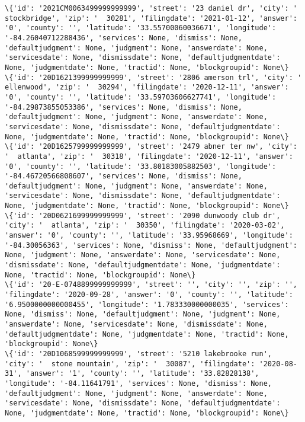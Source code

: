 \documentclass[11pt]{article}
\begin{document}
\begin{Verbatim}[commandchars=\\\{\}]
\{'id': '2021CM0063499999999999', 'street': '23 daniel dr', 'city': '  stockbridge', 'zip': '  30281', 'filingdate': '2021-01-12', 'answer': '0', 'county': '', 'latitude': '33.55700060036671', 'longitude': '-84.26040712288436', 'services': None, 'dismiss': None, 'defaultjudgment': None, 'judgment': None, 'answerdate': None, 'servicesdate': None, 'dismissdate': None, 'defaultjudgmentdate': None, 'judgmentdate': None, 'tractid': None, 'blockgroupid': None\}
\{'id': '20D1621399999999999', 'street': '2806 amerson trl', 'city': '  ellenwood', 'zip': '  30294', 'filingdate': '2020-12-11', 'answer': '0', 'county': '', 'latitude': '33.59703606627741', 'longitude': '-84.29873855053386', 'services': None, 'dismiss': None, 'defaultjudgment': None, 'judgment': None, 'answerdate': None, 'servicesdate': None, 'dismissdate': None, 'defaultjudgmentdate': None, 'judgmentdate': None, 'tractid': None, 'blockgroupid': None\}
\{'id': '20D1625799999999999', 'street': '2479 abner ter nw', 'city': '  atlanta', 'zip': '  30318', 'filingdate': '2020-12-11', 'answer': '0', 'county': '', 'latitude': '33.80183005882503', 'longitude': '-84.46720566808607', 'services': None, 'dismiss': None, 'defaultjudgment': None, 'judgment': None, 'answerdate': None, 'servicesdate': None, 'dismissdate': None, 'defaultjudgmentdate': None, 'judgmentdate': None, 'tractid': None, 'blockgroupid': None\}
\{'id': '20D0621699999999999', 'street': '2090 dunwoody club dr', 'city': '  atlanta', 'zip': '  30350', 'filingdate': '2020-03-02', 'answer': '0', 'county': '', 'latitude': '33.95968669', 'longitude': '-84.30056363', 'services': None, 'dismiss': None, 'defaultjudgment': None, 'judgment': None, 'answerdate': None, 'servicesdate': None, 'dismissdate': None, 'defaultjudgmentdate': None, 'judgmentdate': None, 'tractid': None, 'blockgroupid': None\}
\{'id': '20-E-0748899999999999', 'street': '', 'city': '', 'zip': '', 'filingdate': '2020-09-28', 'answer': '0', 'county': '', 'latitude': '6.9500000000000455', 'longitude': '1.783330000000035', 'services': None, 'dismiss': None, 'defaultjudgment': None, 'judgment': None, 'answerdate': None, 'servicesdate': None, 'dismissdate': None, 'defaultjudgmentdate': None, 'judgmentdate': None, 'tractid': None, 'blockgroupid': None\}
\{'id': '20D1068599999999999', 'street': '5210 lakebrooke run', 'city': '  stone mountain', 'zip': '  30087', 'filingdate': '2020-08-31', 'answer': '1', 'county': '', 'latitude': '33.82828138', 'longitude': '-84.11641791', 'services': None, 'dismiss': None, 'defaultjudgment': None, 'judgment': None, 'answerdate': None, 'servicesdate': None, 'dismissdate': None, 'defaultjudgmentdate': None, 'judgmentdate': None, 'tractid': None, 'blockgroupid': None\}

\end{Verbatim}
\end{document}
